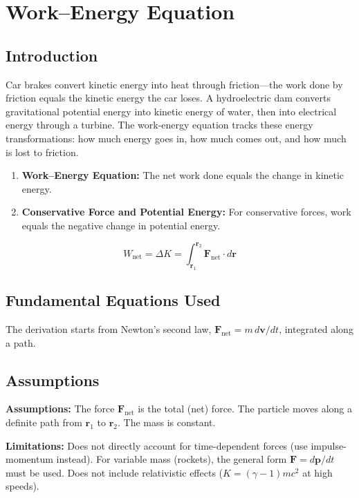 \chapter{Work--Energy Equation}

\section*{Introduction}

Car brakes convert kinetic energy into heat through friction---the work done by friction equals the kinetic energy the car loses. A hydroelectric dam converts gravitational potential energy into kinetic energy of water, then into electrical energy through a turbine. The work-energy equation tracks these energy transformations: how much energy goes in, how much comes out, and how much is lost to friction.

\begin{enumerate}
\item \textbf{Work--Energy Equation:} The net work done equals the change in kinetic energy.

\item \textbf{Conservative Force and Potential Energy:} For conservative forces, work equals the negative change in potential energy.

\end{enumerate}


\[
W_{\text{net}} = \Delta K = \int_{\mathbf{r}_1}^{\mathbf{r}_2} \mathbf{F}_{\text{net}} \cdot d\mathbf{r}
\]

\section*{Fundamental Equations Used}

The derivation starts from Newton's second law, $\mathbf{F}_{\text{net}} = m\,d\mathbf{v}/dt$, integrated along a path.

\section*{Assumptions}

\textbf{Assumptions:} The force $\mathbf{F}_{\text{net}}$ is the total (net) force. The particle moves along a definite path from $\mathbf{r}_1$ to $\mathbf{r}_2$. The mass is constant.


\textbf{Limitations:} Does not directly account for time-dependent forces (use impulse-momentum instead). For variable mass (rockets), the general form $\mathbf{F} = d\mathbf{p}/dt$ must be used. Does not include relativistic effects ($K = (\gamma - 1)mc^2$ at high speeds).


